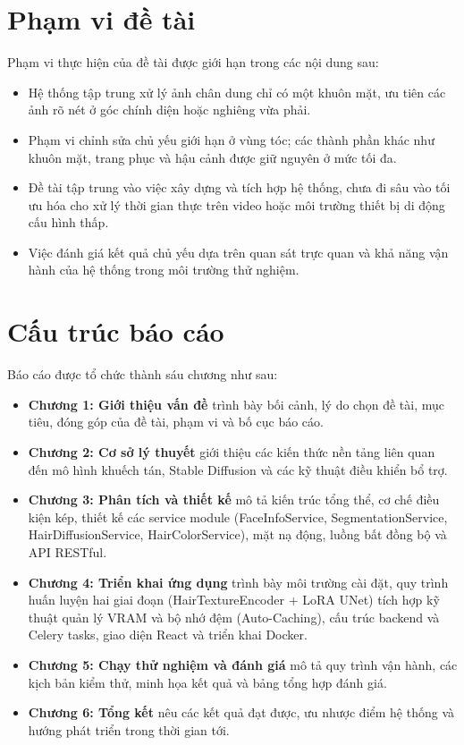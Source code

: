 \documentclass[../main.tex]{subfiles}
\begin{document}
\section{Phạm vi đề tài}
Phạm vi thực hiện của đề tài được giới hạn trong các nội dung sau:
\begin{itemize}
    \item Hệ thống tập trung xử lý ảnh chân dung chỉ có một khuôn mặt, ưu tiên các ảnh rõ nét ở góc chính diện hoặc nghiêng vừa phải.
    \item Phạm vi chỉnh sửa chủ yếu giới hạn ở vùng tóc; các thành phần khác như khuôn mặt, trang phục và hậu cảnh được giữ nguyên ở mức tối đa.
    \item Đề tài tập trung vào việc xây dựng và tích hợp hệ thống, chưa đi sâu vào tối ưu hóa cho xử lý thời gian thực trên video hoặc môi trường thiết bị di động cấu hình thấp.
    \item Việc đánh giá kết quả chủ yếu dựa trên quan sát trực quan và khả năng vận hành của hệ thống trong môi trường thử nghiệm.
\end{itemize}

\section{Cấu trúc báo cáo}
Báo cáo được tổ chức thành sáu chương như sau:
\begin{itemize}
    \item \textbf{Chương 1: Giới thiệu vấn đề} trình bày bối cảnh, lý do chọn đề tài, mục tiêu, đóng góp của đề tài, phạm vi và bố cục báo cáo.
    \item \textbf{Chương 2: Cơ sở lý thuyết} giới thiệu các kiến thức nền tảng liên quan đến mô hình khuếch tán, Stable Diffusion và các kỹ thuật điều khiển bổ trợ.
    \item \textbf{Chương 3: Phân tích và thiết kế} mô tả kiến trúc tổng thể, cơ chế điều kiện kép, thiết kế các service module (FaceInfoService, SegmentationService, HairDiffusionService, HairColorService), mặt nạ động, luồng bất đồng bộ và API RESTful.
    \item \textbf{Chương 4: Triển khai ứng dụng} trình bày môi trường cài đặt, quy trình huấn luyện hai giai đoạn (HairTextureEncoder + LoRA UNet) tích hợp kỹ thuật quản lý VRAM và bộ nhớ đệm (Auto-Caching), cấu trúc backend và Celery tasks, giao diện React và triển khai Docker.
    \item \textbf{Chương 5: Chạy thử nghiệm và đánh giá} mô tả quy trình vận hành, các kịch bản kiểm thử, minh họa kết quả và bảng tổng hợp đánh giá.
    \item \textbf{Chương 6: Tổng kết} nêu các kết quả đạt được, ưu nhược điểm hệ thống và hướng phát triển trong thời gian tới.
\end{itemize}
\end{document}
